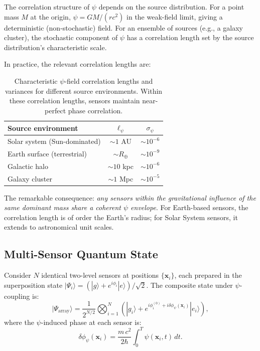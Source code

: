 \documentclass[12pt,a4paper]{article}
\theoremstyle{remark}
\begin{document}
The correlation structure of $\psi$ depends on the source distribution. For
a point mass $M$ at the origin, $\psi = GM/(rc^2)$ in the weak-field limit,
giving a deterministic (non-stochastic) field. For an ensemble of sources
(e.g., a galaxy cluster), the stochastic component of $\psi$ has a
correlation length set by the source distribution's characteristic scale.

In practice, the relevant correlation lengths are:

\begin{table}[H]
\centering
\begin{tabular}{lcc}
\toprule
\textbf{Source environment} & \textbf{$\ell_\psi$} & \textbf{$\sigma_\psi$} \\
\midrule
Solar system (Sun-dominated) & $\sim 1$ AU & $\sim 10^{-6}$ \\
Earth surface (terrestrial) & $\sim R_\oplus$ & $\sim 10^{-9}$ \\
Galactic halo & $\sim 10$ kpc & $\sim 10^{-6}$ \\
Galaxy cluster & $\sim 1$ Mpc & $\sim 10^{-5}$ \\
\bottomrule
\end{tabular}
\caption{Characteristic $\psi$-field correlation lengths and variances for
different source environments. Within these correlation lengths, sensors
maintain near-perfect phase correlation.}
\label{tab:corr-lengths}
\end{table}

The remarkable consequence: \emph{any sensors within the gravitational
influence of the same dominant mass share a coherent $\psi$ envelope}. For
Earth-based sensors, the correlation length is of order the Earth's radius;
for Solar System sensors, it extends to astronomical unit scales.

\subsection{Multi-Sensor Quantum State}\label{sec:multi-sensor}

Consider $N$ identical two-level sensors at positions $\{\mathbf{x}_i\}$,
each prepared in the superposition state
$|\Psi_i\rangle = (|g\rangle + e^{i\phi_i}|e\rangle)/\sqrt{2}$. The
composite state under $\psi$-coupling is:
\begin{equation}
|\Psi_{\text{array}}\rangle = \frac{1}{2^{N/2}}\bigotimes_{i=1}^N
\left(|g_i\rangle + e^{i\phi_i^{(0)} + i\delta\phi_\psi(\mathbf{x}_i)}|e_i\rangle\right),
\label{eq:composite-state}
\end{equation}
where the $\psi$-induced phase at each sensor is:
\begin{equation}
\delta\phi_\psi(\mathbf{x}_i) = \frac{m\,c^2}{2\hbar}\int_0^T \psi(\mathbf{x}_i, t)\,dt.
\label{eq:psi-phase}
\end{equation}
\end{document}
